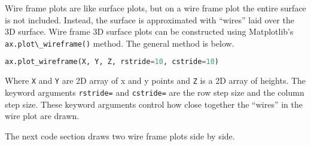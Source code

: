 \documentclass{book}
\newcommand{\passthrough}[1]{#1}
\begin{document}
    
        Wire frame plots are like surface plots, but on a wire frame plot the
entire surface is not included. Instead, the surface is approximated
with ``wires'' laid over the 3D surface. Wire frame 3D surface plots can
be constructed using Matplotlib's
\passthrough{\lstinline!ax.plot\_wireframe()!} method. The general
method is below.

\begin{lstlisting}[language=Python]
ax.plot_wireframe(X, Y, Z, rstride=10, cstride=10)
\end{lstlisting}

Where \passthrough{\lstinline!X!} and \passthrough{\lstinline!Y!} are 2D
array of x and y points and \passthrough{\lstinline!Z!} is a 2D array of
heights. The keyword arguments \passthrough{\lstinline!rstride=!} and
\passthrough{\lstinline!cstride=!} are the row step size and the column
step size. These keyword arguments control how close together the
``wires'' in the wire plot are drawn.

The next code section draws two wire frame plots side by side.
    
\end{document}
